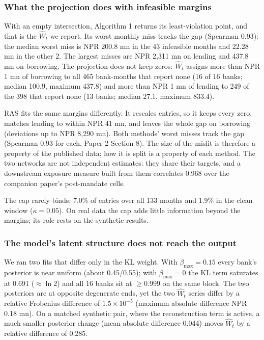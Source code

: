 \documentclass[
  a4paper,
]{article}
\begin{document}
\subsubsection*{What the projection does with infeasible
margins}\label{what-the-projection-does-with-infeasible-margins}

With an empty intersection, Algorithm 1 returns its least-violation
point, and that is the \(\hat W_t\) we report. Its worst monthly miss
tracks the gap (Spearman 0.93): the median worst miss is NPR 200.8 mn in
the 43 infeasible months and 22.28 mn in the other 2. The largest misses
are NPR 2,311 mn on lending and 437.8 mn on borrowing. The projection
does not keep zeros: \(\hat W_t\) assigns more than NPR 1 mn of
borrowing to all 465 bank-months that report none (16 of 16 banks;
median 100.9, maximum 437.8) and more than NPR 1 mn of lending to 249 of
the 398 that report none (13 banks; median 27.1, maximum 833.4).

RAS fits the same margins differently. It rescales entries, so it keeps
every zero, matches lending to within NPR 41 mn, and leaves the whole
gap on borrowing (deviations up to NPR 8,290 mn). Both methods' worst
misses track the gap (Spearman 0.93 for each, Paper 2 Section 8). The
size of the misfit is therefore a property of the published data; how it
is split is a property of each method. The two networks are not
independent estimates: they share their targets, and a downstream
exposure measure built from them correlates 0.968 over the companion
paper's post-mandate cells.

The cap rarely binds: 7.0\% of entries over all 133 months and 1.9\% in
the clean window (\(\kappa = 0.05\)). On real data the cap adds little
information beyond the margins; its role rests on the synthetic results.

\subsubsection*{The model's latent structure does not reach the
output}\label{the-models-latent-structure-does-not-reach-the-output}

We ran two fits that differ only in the KL weight. With
\(\beta_{\max} = 0.15\) every bank's posterior is near uniform (about
0.45/0.55); with \(\beta_{\max} = 0\) the KL term saturates at 0.691
(\(\approx \ln 2\)) and all 16 banks sit at \(\ge 0.999\) on the same
block. The two posteriors are at opposite degenerate ends, yet the two
\(\hat W_t\) series differ by a relative Frobenius difference of
\(1.5\times10^{-5}\) (maximum absolute difference NPR 0.18 mn). On a
matched synthetic pair, where the reconstruction term is active, a much
smaller posterior change (mean absolute difference 0.044) moves
\(\hat W_t\) by a relative difference of 0.285.
\end{document}
